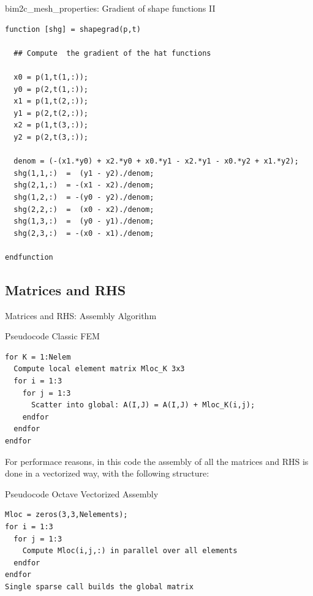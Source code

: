 \documentclass[aspectratio=54,xcolor=dvipsnames]{beamer}
\begin{document}
\begin{frame}[fragile]{bim2c\_mesh\_properties: Gradient of shape functions II}
\scriptsize
\begin{lstlisting}[firstnumber=427]
function [shg] = shapegrad(p,t)
  
  ## Compute  the gradient of the hat functions
  
  x0 = p(1,t(1,:));
  y0 = p(2,t(1,:));
  x1 = p(1,t(2,:));
  y1 = p(2,t(2,:));
  x2 = p(1,t(3,:));
  y2 = p(2,t(3,:));

  denom = (-(x1.*y0) + x2.*y0 + x0.*y1 - x2.*y1 - x0.*y2 + x1.*y2);
  shg(1,1,:)  =  (y1 - y2)./denom;
  shg(2,1,:)  = -(x1 - x2)./denom;
  shg(1,2,:)  = -(y0 - y2)./denom;
  shg(2,2,:)  =  (x0 - x2)./denom;
  shg(1,3,:)  =  (y0 - y1)./denom;
  shg(2,3,:)  = -(x0 - x1)./denom;

endfunction
\end{lstlisting}
\end{frame}

\subsection{Matrices and RHS}
\begin{frame}[fragile]{Matrices and RHS: Assembly Algorithm}
\scriptsize
\begin{block}{Pseudocode Classic FEM}
\begin{verbatim}
for K = 1:Nelem
  Compute local element matrix Mloc_K 3x3
  for i = 1:3
    for j = 1:3
      Scatter into global: A(I,J) = A(I,J) + Mloc_K(i,j);
    endfor
  endfor
endfor
\end{verbatim}
\end{block}

For performace reasons, in this code the assembly of all the matrices and RHS is done in a vectorized way, with the following structure:
\begin{block}{Pseudocode Octave Vectorized Assembly}
\begin{verbatim}
Mloc = zeros(3,3,Nelements);
for i = 1:3
  for j = 1:3
    Compute Mloc(i,j,:) in parallel over all elements
  endfor
endfor
Single sparse call builds the global matrix
\end{verbatim}
\end{block}
\end{frame}
\end{document}
